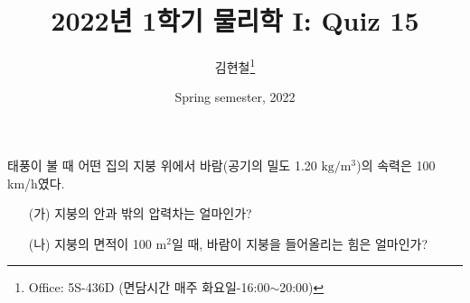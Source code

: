 \documentclass[floatfix,nofootinbib,superscriptaddress,fleqn]{revtex4-2}
\begin{document}
\title{\Large 2022년 1학기 물리학 I: Quiz 15}
\author{김현철\footnote{Office: 5S-436D (면담시간 매주
    화요일-16:00$\sim$20:00)}} 
\date{Spring semester, 2022}


\vspace{1.cm}

\maketitle


태풍이 불 때 어떤 집의 지붕 위에서 바람(공기의 밀도 1.20 $\mathrm{kg/m^3}$)의
속력은 100 km/h였다.
\begin{itemize}
\item[(가)] 지붕의 안과 밖의 압력차는 얼마인가? 
\item[(나)] 지붕의 면적이 100 $\mathrm{m^2}$일 때, 바람이 지붕을
  들어올리는 힘은 얼마인가? 
 \end{itemize}
\end{document}
